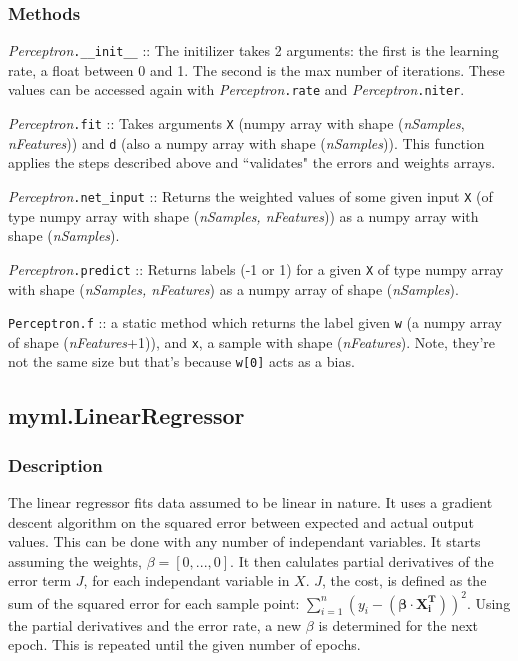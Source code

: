 \documentclass{article}
\begin{document}
\subsubsection{Methods}

\textit{Perceptron}\texttt{.\_\_init\_\_} :: The initilizer takes 2 arguments: the
first is the learning rate, a float between 0 and 1. The second is the max
number of iterations. These values can be accessed again with
\textit{Perceptron}\texttt{.rate} and \textit{Perceptron}\texttt{.niter}.

\textit{Perceptron}\texttt{.fit} :: Takes arguments \texttt{X} (numpy array
with shape (\textit{nSamples}, \textit{nFeatures})) and \texttt{d} (also a
numpy array with shape (\textit{nSamples})). This function applies the steps
described above and ``validates" the errors and weights arrays.

\textit{Perceptron}\texttt{.net\_input} :: Returns the weighted values of some
given input \texttt{X} (of type numpy array with shape
(\textit{nSamples, nFeatures})) as a numpy array with shape (\textit{nSamples}).

\textit{Perceptron}\texttt{.predict} :: Returns labels (-1 or 1) for a given
\texttt{X} of type numpy array with shape (\textit{nSamples, nFeatures}) as a
numpy array of shape (\textit{nSamples}).

\texttt{Perceptron.f} :: a static method which returns the label given
\texttt{w} (a numpy array of shape (\textit{nFeatures}+1)), and \texttt{x}, a
sample with shape (\textit{nFeatures}). Note, they're not the same size but
that's because \texttt{w[0]} acts as a bias.

\subsection{myml.LinearRegressor}

\subsubsection{Description}

The linear regressor fits data assumed to be linear in nature. It uses a gradient
descent algorithm on the squared error between expected and actual output values. This
can be done with any number of independant variables. It starts assuming the weights, $\beta = [0, ..., 0]$.
It then calulates partial derivatives of the error term $J$, for each independant variable in $X$.
$J$, the cost, is defined as the sum of the squared error for each sample point: $\sum_{i=1}^{n}(y_i-(\mathbf{\beta}\cdot\mathbf{X^T_i}))^2$.
Using the partial derivatives and the error rate, a new $\beta$ is determined for
the next epoch. This is repeated until the given number of epochs.
\end{document}
